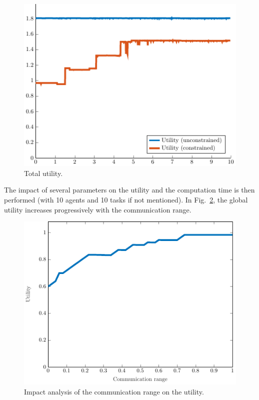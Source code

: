 \documentclass{ifacconf}
\begin{document}
\begin{figure}[h]
  \centering
  \includegraphics[width=0.8\linewidth]{Figures/TotalUtility.pdf}
  \caption{Total utility.}
  \label{fig:TotalUtility}
\end{figure}

The impact of several parameters on the utility and the computation time is then performed (with 10 agents and 10 tasks if not mentioned). In Fig.~\ref{fig:RangeLimitationUtility}, the global utility increases progressively with the communication range. 

\begin{figure}[h]
  \centering
  \includegraphics[width=0.8\linewidth]{Figures/RangeLimitationUtility.pdf}
  \caption{Impact analysis of the communication range on the utility.}
  \label{fig:RangeLimitationUtility}
\end{figure}
\end{document}
